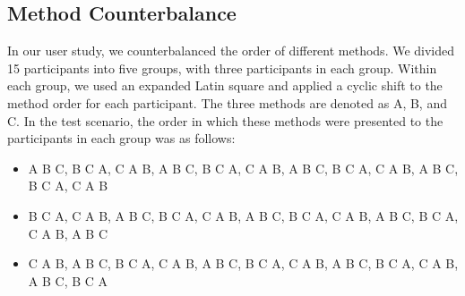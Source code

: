 \subsection{Method Counterbalance}
In our user study, we counterbalanced the order of different methods.
We divided 15 participants into five groups, with three participants in each group. 
Within each group, we used an expanded Latin square and applied a cyclic shift to the method order for each participant.
The three methods are denoted as A, B, and C.
In the test scenario, the order in which these methods were presented to the participants in each group was as follows:
\begin{itemize}
    \item A B C, B C A, C A B, A B C, B C A, C A B, A B C, B C A, C A B, A B C, B C A, C A B
    \item B C A, C A B, A B C, B C A, C A B, A B C, B C A, C A B, A B C, B C A, C A B, A B C
    \item C A B, A B C, B C A, C A B, A B C, B C A, C A B, A B C, B C A, C A B, A B C, B C A
\end{itemize}